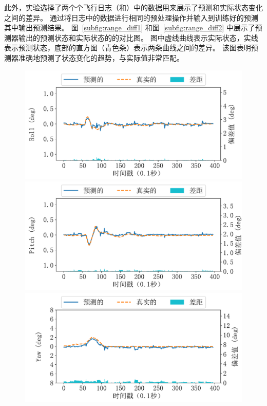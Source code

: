 

此外，实验选择了两个个飞行日志（和）中的数据用来展示了预测和实际状态变化之间的差异。
通过将日志中的数据进行相同的预处理操作并输入到训练好的预测其中输出预测结果。
图~\ref{subfig:range_diff1} 和图~\ref{subfig:range_diff2} 中展示了预测器输出的预测状态和实际状态的的对比图。
图中虚线曲线表示实际状态，实线表示预测状态，底部的直方图（青色条）表示两条曲线之间的差异。
该图表明预测器准确地预测了状态变化的趋势，与实际值非常匹配。



\begin{figure}[htb]
\centering
\begin{minipage}{0.49\linewidth}
    \includegraphics[width=\linewidth]{fig/range/ardu_real_roll.pdf}\quad
    \includegraphics[width=\linewidth]{fig/range/ardu_real_pitch.pdf}\quad
    \includegraphics[width=\linewidth]{fig/range/ardu_real_yaw.pdf}

\end{minipage}
\end{figure}
